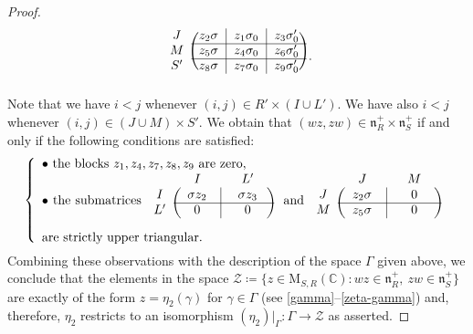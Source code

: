 \documentclass[ALCO,Unicode]{cedram}
\newcommand{\fn}{\mathfrak{n}}
\newcommand{\Mat}{\mathrm{M}}
\newcommand{\mC}{\mathbb{C}}
\begin{document}
\begin{proof}
\[\begin{blockarray}{cccc}
\begin{block}{c(c|c|c)}
J & z_2\sigma & z_1\sigma_0 & z_3\sigma_0'\\
\cline{2-4}
M & z_5\sigma & z_4\sigma_0 & z_6\sigma_0'\\
\cline{2-4}
S' & z_8\sigma & z_7\sigma_0 & z_9\sigma_0'\\
\end{block}
\end{blockarray}\,.
\]
Note that we have $i<j$ whenever $(i,j)\in R'\times(I\cup L')$. We have also $i<j$ whenever $(i,j)\in(J\cup M)\times S'$. We obtain that $(wz,zw)\in\fn_R^+\times \fn_S^+$ if and only if the following conditions are satisfied:
\[
\left\{\begin{array}{ll}
\mbox{$\bullet$ the blocks $z_1,z_4,z_7,z_8,z_9$ are zero},\\
\parbox{11cm}{$\bullet$ the submatrices $\begin{blockarray}{ccc}
{} & {\quad I\quad} & {\quad L'\quad}\\
\begin{block}{c(c|c)}
I & \sigma z_2 & \sigma z_3\\
\cline{2-3}
L' & 0 & 0\\
\end{block}
\end{blockarray}$
\ and $\begin{blockarray}{ccc}
{} & {\quad J\quad} & {\quad M\quad}\\
\begin{block}{c(c|c)}
J & z_2\sigma & 0\\
\cline{2-3}
M & z_5\sigma & 0\\
\end{block}
\end{blockarray}$
\ are strictly upper triangular.}
\end{array}\right.
\]
Combining these observations with the description of the space $\Gamma$ given above, we conclude that the elements in the space $\mathcal{Z}\coloneqq \{z\in\Mat_{S,R}(\mC):wz\in\fn_R^+,\ zw\in\fn_S^+\}$ are exactly of the form $z=\eta_2(\gamma)$ for $\gamma\in\Gamma$ (see \eqref{gamma}--\eqref{zeta-gamma}) and, therefore, $\eta_2$ restricts to an isomorphism $(\eta_2)|_\Gamma:\Gamma\to\mathcal{Z}$ as asserted.


\end{proof}
\end{document}
